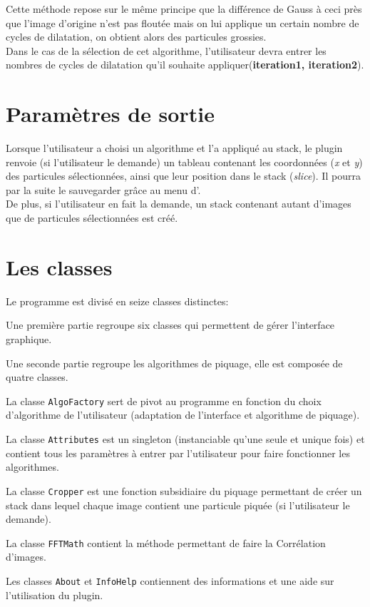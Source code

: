 Cette méthode repose sur le même principe que la différence de Gauss à ceci près que l'image d'origine n'est pas floutée mais on lui applique un certain nombre de cycles de dilatation, on obtient alors des particules grossies.\\
Dans le cas de la sélection de cet algorithme, l'utilisateur devra entrer les nombres de cycles de dilatation qu'il souhaite appliquer(\textbf{iteration1, iteration2}).

\section{Paramètres de sortie}

Lorsque l'utilisateur a choisi un algorithme et l'a appliqué au stack, le plugin renvoie (si l'utilisateur le demande) un tableau contenant les coordonnées (\emph{x} et \emph{y}) des particules sélectionnées, ainsi que leur position dans le stack (\emph{slice}). Il pourra par la suite le sauvegarder gr\^ace au menu d'\imj. \\
De plus, si l'utilisateur en fait la demande, un stack contenant autant d'images que de particules sélectionnées est créé.

\section{Les classes}

Le programme est divisé en seize classes distinctes:
\begin{list}{•}
\item Une première partie regroupe six classes qui permettent de gérer l'interface graphique.
\item
\item Une seconde partie regroupe les algorithmes de piquage, elle est composée de quatre classes.
\item La classe \texttt{AlgoFactory} sert de pivot au programme en fonction du choix d'algorithme de l'utilisateur (adaptation de l'interface et algorithme de piquage).
\item La classe \texttt{Attributes} est un singleton (instanciable qu'une seule et unique fois) et contient tous les paramètres à entrer par l'utilisateur pour faire fonctionner les algorithmes.
\item La classe \texttt{Cropper} est une fonction subsidiaire du piquage permettant de créer un stack dans lequel chaque image contient une particule piquée (si l'utilisateur le demande).
\item La classe \texttt{FFTMath} contient la méthode permettant de faire la Corrélation d'images.
\item Les classes \texttt{About} et \texttt{InfoHelp} contiennent des informations et une aide sur l'utilisation du plugin.
\end{list}

